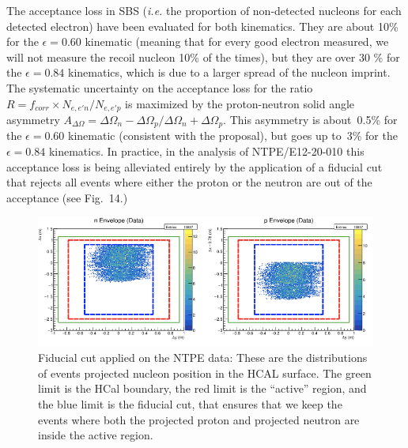 The acceptance loss in SBS ({\it i.e.} the proportion of non-detected nucleons for each detected electron) have been evaluated for both kinematics.
They are about 10\% for the $\epsilon = 0.60$ kinematic (meaning that for every good electron measured, we will not measure the recoil nucleon 10\% of the times), but they are over 30 \% for the $\epsilon= 0.84$ kinematics, which is due to a larger spread of the nucleon imprint.
The systematic uncertainty on the acceptance loss for the ratio $R = f_{corr} \times N_{e,e'n}/N_{e,e'p}$ is maximized by the proton-neutron solid angle asymmetry $A_{\Delta\Omega} = {\Delta\Omega_n-\Delta\Omega_p}/{\Delta\Omega_n+\Delta\Omega_p}$.
This asymmetry is about~0.5\% for the $\epsilon = 0.60$ kinematic (consistent with the \gmn proposal), but goes up to~3\% for the $\epsilon= 0.84$ kinematics.
In practice, in the analysis of NTPE/E12-20-010 this acceptance loss is being alleviated entirely by the application of a fiducial cut that rejects all events where either the proton or the neutron are out of the acceptance (see Fig.~14.)%
%
\begin{figure}[!h]
  \centering
    \includegraphics[width=12cm]{Plots/FiducialCut.png}
    \caption{Fiducial cut applied on the NTPE data: These are the distributions of events projected nucleon position in the HCAL surface. The green limit is the HCal boundary, the red limit is the ``active'' region, and the blue limit is the fiducial cut, that ensures that we keep the events where both the projected proton and projected neutron are inside the active region.}
    \label{fig:fidcut}
\end{figure}
%



